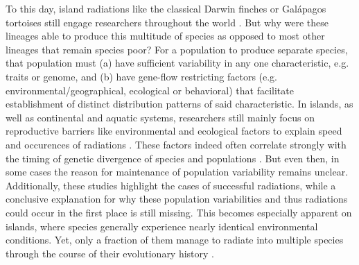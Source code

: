\documentclass[a4paper]{scrartcl}
\begin{document}
To this day, island radiations like the classical Darwin finches or Galápagos tortoises %
still engage researchers throughout the world \cite{roman-palaciosTortoiseFinchTesting}.
But why were these lineages able to produce this multitude of species as opposed to most other lineages that remain species poor?
For a population to produce separate species, that population must
(a) have sufficient variability in any one characteristic, e.g. traits or genome, and
(b) have gene-flow restricting factors (e.g. environmental/geographical, ecological or behavioral) that facilitate establishment of distinct distribution patterns of said characteristic.
In islands, as well as continental and aquatic systems, researchers still mainly focus on reproductive barriers like environmental and ecological factors to explain speed and occurences of radiations \cite{krugSpeciesGenusRatios2008}\cite{hurlbertProcessesGeneratingLatitudinal2014}\cite{willisSpeciesDiversityScale2002}. %
These factors indeed often correlate strongly with the timing of genetic divergence of species and populations \cite{hembryEvolutionaryBiogeographyTerrestrial}. %
But even then, in some cases the reason for maintenance of population variability remains unclear. \cite{chenConcordanceGeneticDiversity}
Additionally, these studies highlight the cases of successful radiations, while a conclusive explanation for why these population variabilities and thus radiations could occur in the first place is still missing.
This becomes especially apparent on islands, where species generally experience nearly identical environmental conditions.%
Yet, only a fraction of them manage to radiate into multiple species through the course of their evolutionary history \cite{hembryEvolutionaryBiogeographyTerrestrial}.
\end{document}
